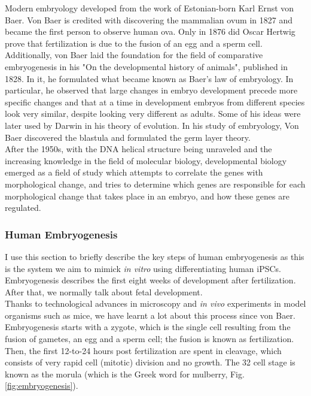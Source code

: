 Modern embryology developed from the work of Estonian-born Karl Ernst von Baer.
Von Baer is credited with discovering the mammalian ovum in 1827 and became the first person to observe human ova.
Only in 1876 did Oscar Hertwig prove that fertilization is due to the fusion of an egg and a sperm cell.
Additionally, von Baer laid the foundation for the field of comparative embryogenesis in his "On the developmental history of animals", published in 1828.
In it, he formulated what became known as Baer's law of embryology.
In particular, he observed that large changes in embryo development precede more specific changes and that at a time in development embryos from different species look very similar, despite looking very different as adults.
Some of his ideas were later used by Darwin in his theory of evolution.
In his study of embryology, Von Baer discovered the blastula and formulated the germ layer theory.\\

After the 1950s, with the DNA helical structure being unraveled and the increasing knowledge in the field of molecular biology, developmental biology emerged as a field of study which attempts to correlate the genes with morphological change, and tries to determine which genes are responsible for each morphological change that takes place in an embryo, and how these genes are regulated.

\subsubsection{Human Embryogenesis}


I use this section to briefly describe the key steps of human embryogenesis as this is the system we aim to mimick \textit{in vitro} using differentiating human iPSCs.
Embryogenesis describes the first eight weeks of development after fertilization.
After that, we normally talk about fetal development.\\

Thanks to technological advances in microscopy and \textit{in vivo} experiments in model organisms such as mice, we have learnt a lot about this process since von Baer.
Embryogenesis starts with a zygote, which is the single cell resulting from the fusion of gametes, an egg and a sperm cell; the fusion is known as fertilization.
Then, the first 12-to-24 hours post fertilization are spent in cleavage, which consists of very rapid cell (mitotic) division and no growth.
The 32 cell stage is known as the morula (which is the Greek word for mulberry, Fig. \ref{fig:embryogenesis}).\\

